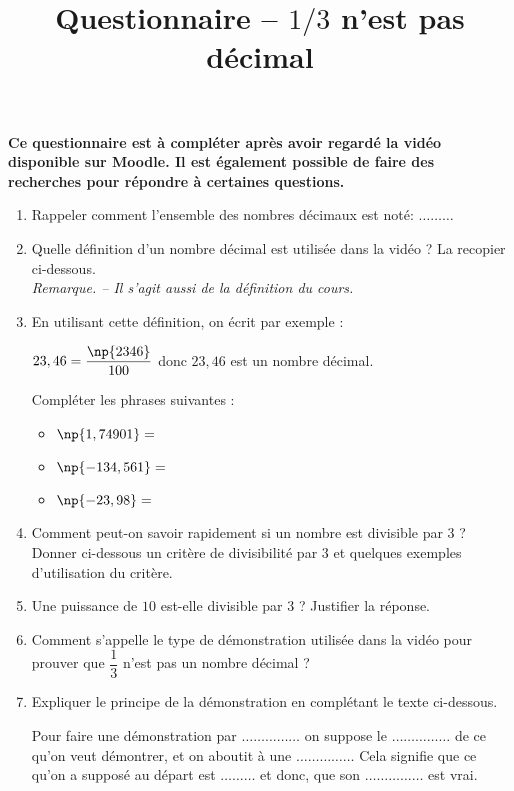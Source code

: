 \documentclass[a4paper,dvipsnames]{article}
\begin{document}
\title{Questionnaire -- $1/3$ n'est pas décimal}

\date{}
\author{}

\maketitle{}

\thispagestyle{empty}
\pagestyle{empty}

\textbf{Ce questionnaire est à compléter après avoir regardé la vidéo disponible sur Moodle. Il est également possible de faire des recherches pour répondre à certaines questions.}

\bigskip

\begin{enumerate}
  \item Rappeler comment l'ensemble des nombres décimaux est noté: $\hdots\hdots\hdots$
  \item Quelle définition d'un nombre décimal est utilisée dans la vidéo ? La recopier ci-dessous.\\
    \textit{Remarque. -- Il s'agit aussi de la définition du cours.}
  \item En utilisant cette définition, on écrit par exemple :
    \begin{center}
      $23,46=\dfrac{\np{2346}}{100}$ donc $23,46$ est un nombre décimal.
    \end{center}
    Compléter les phrases suivantes :
    \begin{itemize}
      \item[] $\np{1,74901}=$\dotfill
      \item[] $\np{-134,561}=$\dotfill
      \item[] $\np{-23,98}=$\dotfill
    \end{itemize}
  \item Comment peut-on savoir rapidement si un nombre est divisible par $3$ ? Donner ci-dessous un critère de divisibilité par $3$ et quelques exemples d'utilisation du critère.
  \item Une puissance de $10$ est-elle divisible par $3$ ? Justifier la réponse.
  \item Comment s'appelle le type de démonstration utilisée dans la vidéo pour prouver que $\dfrac{1}{3}$ n'est pas un nombre décimal ?
  \item Expliquer le principe de la démonstration en complétant le texte ci-dessous.
    \begin{center}
      Pour faire une démonstration par $\hdots\hdots\hdots\hdots\hdots$ on suppose le $\hdots\hdots\hdots\hdots\hdots$ de ce qu'on veut démontrer, et on aboutit à une $\hdots\hdots\hdots\hdots\hdots$ Cela signifie que ce qu'on a supposé au départ est $\hdots\hdots\hdots$ et donc, que son $\hdots\hdots\hdots\hdots\hdots$ est vrai.
    \end{center}
\end{enumerate}
\end{document}
